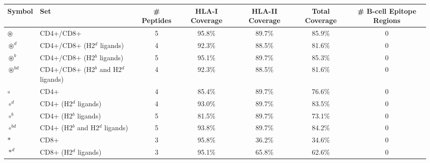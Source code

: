 \begin{tabular}{llccccc}
\toprule
                                              Symbol &                                      Set &  \# Peptides & HLA-I Coverage & HLA-II Coverage & Total Coverage &  \# B-cell Epitope Regions \\
\midrule
                                     $ \circledast $ &                                CD4+/CD8+ &            5 &         95.8\% &          89.7\% &         85.9\% &                          0 \\
                                   $ \circledast^d $ &               CD4+/CD8+ (H2$^d$ ligands) &            4 &         92.3\% &          88.5\% &         81.6\% &                          0 \\
                                   $ \circledast^b $ &               CD4+/CD8+ (H2$^b$ ligands) &            5 &         95.1\% &          89.7\% &         85.3\% &                          0 \\
                                $ \circledast^{bd} $ &    CD4+/CD8+ (H2$^b$ and H2$^d$ ligands) &            4 &         92.3\% &          88.5\% &         81.6\% &                          0 \\
                                           $ \circ $ &                                     CD4+ &            4 &         85.4\% &          89.7\% &         76.6\% &                          0 \\
                                         $ \circ^d $ &                    CD4+ (H2$^d$ ligands) &            4 &         93.0\% &          89.7\% &         83.5\% &                          0 \\
                                         $ \circ^b $ &                    CD4+ (H2$^b$ ligands) &            5 &         81.5\% &          89.7\% &         73.1\% &                          0 \\
                                      $ \circ^{bd} $ &         CD4+ (H2$^b$ and H2$^d$ ligands) &            5 &         93.8\% &          89.7\% &         84.2\% &                          0 \\
                                            $ \ast $ &                                     CD8+ &            3 &         95.8\% &          36.2\% &         34.6\% &                          0 \\
                                          $ \ast^d $ &                    CD8+ (H2$^d$ ligands) &            3 &         95.1\% &          65.8\% &         62.6\% &                          0 \\

\end{tabular}
